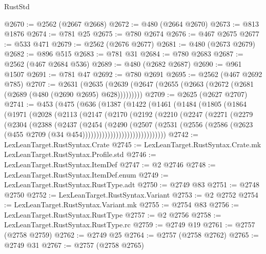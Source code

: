 \begin{lexlean}{RustStd}
\begin{coremodule}
@2670 := @2562 (@2667 @2668)
@2672 := @480 (@2664 @2670)
@2673 := @813 @1876
@2674 := @781 @25
@2675 := @780 @2674
@2676 := @467 @2675
@2677 := @533 @471
@2679 := @2562 (@2676 @2677)
@2681 := @480 (@2673 @2679)
@2682 := @896 @515
@2683 := @781 @31
@2684 := @780 @2683
@2687 := @2562 (@467 @2684 @536)
@2689 := @480 (@2682 @2687)
@2690 := @961 @1507
@2691 := @781 @47
@2692 := @780 @2691
@2695 := @2562 (@467 @2692 @785)
@2707 := @2631
    (@2635 (@2639 (@2647 (@2655 (@2663 (@2672 (@2681 (@2689 (@480 (@2690 @2695) @628)))))))))
@2709 := @2625 (@2627 @2707)
@2741 := @453
    (@475
      (@636
        (@1387
          (@1422
            (@1461
              (@1484
                (@1805
                  (@1864
                    (@1971
                      (@2028
                        (@2113
                          (@2147
                            (@2170
                              (@2192
                                (@2210
                                  (@2247
                                    (@2271
                                      (@2279
                                        (@2304
                                          (@2388
                                            (@2437
                                              (@2454
                                                (@2490
                                                  (@2507
                                                    (@2531
                                                      (@2556
                                                        (@2586
                                                          (@2623
                                                            (@455
                                                              @2709
                                                              (@34
                                                                @454))))))))))))))))))))))))))))))
@2742 := LexLeanTarget.RustSyntax.Crate
@2745 := LexLeanTarget.RustSyntax.Crate.mk LexLeanTarget.RustSyntax.Profile.std
@2746 := LexLeanTarget.RustSyntax.ItemDef
@2747 := @2 @2746
@2748 := LexLeanTarget.RustSyntax.ItemDef.enum
@2749 := LexLeanTarget.RustSyntax.RustType.adt
@2750 := @2749 @83
@2751 := @2748 @2750
@2752 := LexLeanTarget.RustSyntax.Variant
@2753 := @2 @2752
@2754 := LexLeanTarget.RustSyntax.Variant.mk
@2755 := @2754 @83
@2756 := LexLeanTarget.RustSyntax.RustType
@2757 := @2 @2756
@2758 := LexLeanTarget.RustSyntax.RustType.rc
@2759 := @2749 @19
@2761 := @2757 (@2758 @2759)
@2762 := @2749 @25
@2764 := @2757 (@2758 @2762)
@2765 := @2749 @31
@2767 := @2757 (@2758 @2765)

\end{coremodule}
\end{lexlean}
